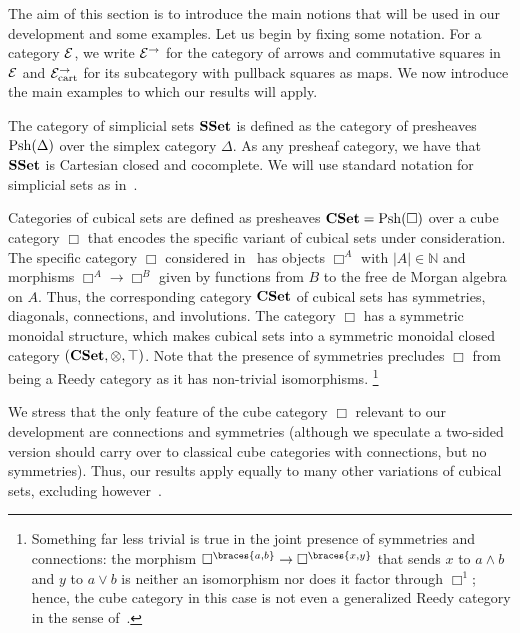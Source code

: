 \documentclass[reqno,10pt,a4paper,oneside,draft]{amsart}
\begin{document}
The aim of this section is to introduce the main notions that will be used in our development and some examples.
Let us begin by fixing some notation.
For a category $\cal{E}$, we write $\cal{E}^\to$ for the category of arrows and commutative squares in $\cal{E}$ and $\cal{E}^\to_{\cart}$ for its subcategory with pullback squares as maps.
We now introduce the main examples to which our results will apply.

\begin{example}
The category of simplicial sets $\SSet$ is defined as the category of presheaves $\Psh(\Delta)$ over the simplex category $\Delta$.
As any presheaf category, we have that $\SSet$ is Cartesian closed and cocomplete.
We will use standard notation for simplicial sets as in~\cite{goerss-jardine}.
\end{example}

\begin{example}
Categories of cubical sets are defined as presheaves $\CSet = \Psh(\Box)$ over a cube category $\Box$ that encodes the specific variant of cubical sets under consideration.
The specific category $\Box$ considered in~\cite{coquand-face,coquand-variation} has objects $\Box^A$ with $|A| \in \mathbb{N}$ and morphisms $\Box^A \to \Box^B$ given by functions from $B$ to the free de Morgan algebra on $A$.
Thus, the corresponding category $\CSet$ of cubical sets has symmetries, diagonals, connections, and involutions.
The category $\Box$ has a symmetric monoidal structure, which makes cubical sets into a symmetric monoidal closed category $(\CSet, \otimes, \top)$.
Note that the presence of symmetries precludes $\Box$ from being a Reedy category as it has non-trivial isomorphisms.%
\footnote{
Something far less trivial is true in the joint presence of symmetries and connections: the morphism $\Box^{\braces{a, b}} \to \Box^{\braces{x, y}}$ that sends $x$ to $a \wedge b$ and $y$ to $a \vee b$ is neither an isomorphism nor does it factor through $\Box^1$; hence, the cube category in this case is not even a generalized Reedy category in the sense of~\cite{berger-moerdijk:generalized-reedy}.
}
\end{example}

We stress that the only feature of the cube category $\Box$ relevant to our development are connections and symmetries (although we speculate a two-sided version should carry over to classical cube categories with connections, but no symmetries).
Thus, our results apply equally to many other variations of cubical sets, excluding however~\cite{coquand-cubical-sets}.
\end{document}
